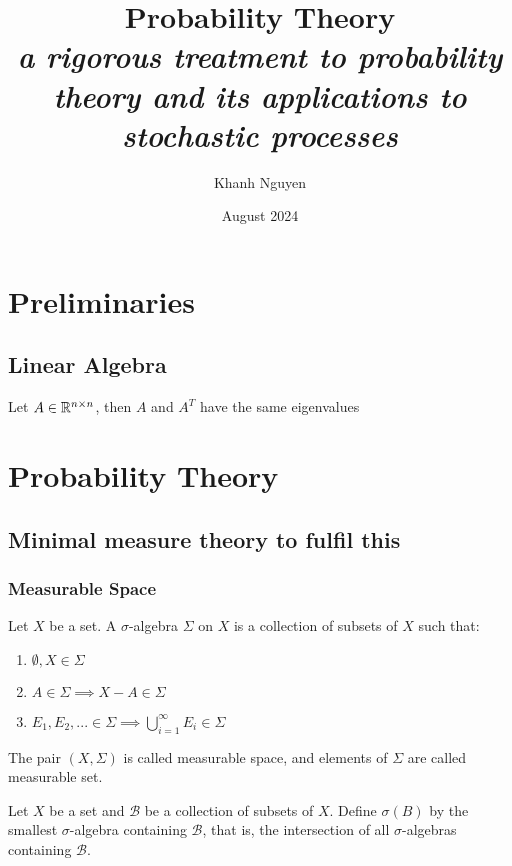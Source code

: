 \documentclass{report}
\title{
Probability Theory \\
\large 
\emph{
a rigorous treatment to probability theory and its applications to stochastic processes \\
}
}
\author{Khanh Nguyen}
\date{August 2024}
\begin{document}
\maketitle

\chapter{Preliminaries}

\section{Linear Algebra}

\begin{proposition}
    Let $A \in \mathbb{R}^{n \times n}$, then $A$ and $A^T$ have the same eigenvalues
\end{proposition}

\chapter{Probability Theory}

\section{Minimal measure theory to fulfil this}

\subsection{Measurable Space}

\begin{definition}
    Let $X$ be a set. A $\sigma$-algebra $\Sigma$ on $X$ is a collection of subsets of $X$ such that:
    \begin{enumerate}
        \item $\emptyset, X \in \Sigma$
        \item $A \in \Sigma \implies X - A \in \Sigma$
        \item $E_1, E_2, ... \in \Sigma \implies \bigcup_{i=1}^\infty E_i \in \Sigma$
    \end{enumerate}
    The pair $(X, \Sigma)$ is called measurable space, and elements of $\Sigma$ are called measurable set.
\end{definition}

\begin{definition}
    Let $X$ be a set and $\mathcal{B}$ be a collection of subsets of $X$. Define $\sigma(B)$ by the smallest $\sigma$-algebra containing $\mathcal{B}$, that is, the intersection of all $\sigma$-algebras containing $\mathcal{B}$. 
\end{definition}
\end{document}
